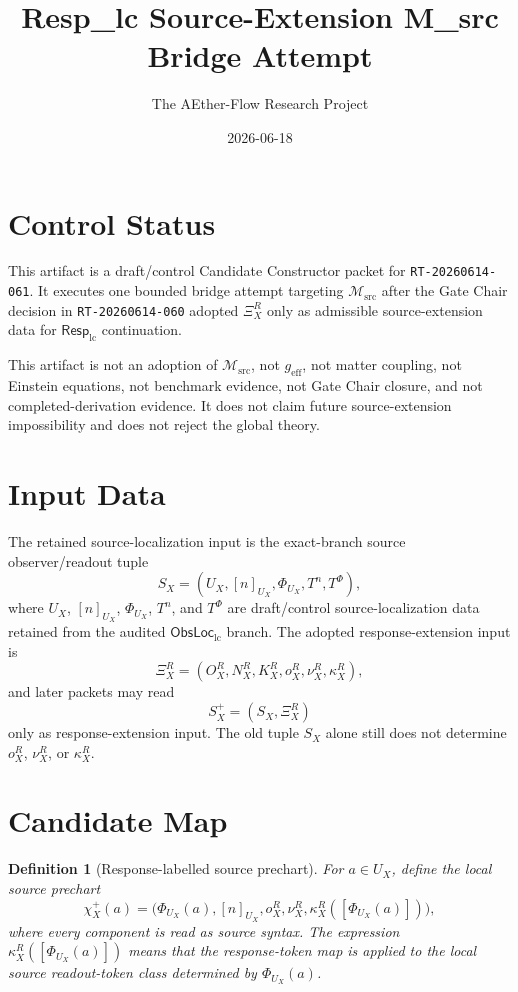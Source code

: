 \documentclass[11pt]{article}
\title{Resp\_lc Source-Extension M\_src Bridge Attempt}
\author{The AEther-Flow Research Project}
\date{2026-06-18}
\newcommand{\RespLC}{\mathsf{Resp}_{\mathrm{lc}}}
\newcommand{\ObsLocLC}{\mathsf{ObsLoc}_{\mathrm{lc}}}
\newcommand{\Msrc}{\mathcal{M}_{\mathrm{src}}}
\newcommand{\geff}{g_{\mathrm{eff}}}
\newcommand{\XiR}{\Xi_X^R}
\newcommand{\SX}{S_X}
\newcommand{\Splus}{S_X^+}
\newcommand{\PhiU}{\Phi_{U_X}}
\newtheorem{definition}{Definition}
\begin{document}
\maketitle

\section*{Control Status}

This artifact is a draft/control Candidate Constructor packet for
\texttt{RT-20260614-061}. It executes one bounded bridge attempt
targeting \(\Msrc\) after the Gate Chair decision in
\texttt{RT-20260614-060} adopted \(\XiR\) only as admissible
source-extension data for \(\RespLC\) continuation.

This artifact is not an adoption of \(\Msrc\), not \(\geff\), not
matter coupling, not Einstein equations, not benchmark evidence, not
Gate Chair closure, and not completed-derivation evidence. It does not
claim future source-extension impossibility and does not reject the
global theory.

\section{Input Data}

The retained source-localization input is the exact-branch
source observer/readout tuple
\[
  \SX=(U_X,[n]_{U_X},\PhiU,T^n,T^\Phi),
\]
where \(U_X\), \([n]_{U_X}\), \(\PhiU\), \(T^n\), and \(T^\Phi\)
are draft/control source-localization data retained from the audited
\(\ObsLocLC\) branch. The adopted response-extension input is
\[
  \XiR=(O_X^R,N_X^R,K_X^R,o_X^R,\nu_X^R,\kappa_X^R),
\]
and later packets may read
\[
  \Splus=(\SX,\XiR)
\]
only as response-extension input. The old tuple \(\SX\) alone still
does not determine \(o_X^R\), \(\nu_X^R\), or \(\kappa_X^R\).

\section{Candidate Map}

\begin{definition}[Response-labelled source prechart]
For \(a\in U_X\), define the local source prechart
\[
  \chi_X^+(a)=
  \bigl(\PhiU(a),[n]_{U_X},o_X^R,\nu_X^R,
  \kappa_X^R([\PhiU(a)])\bigr),
\]
where every component is read as source syntax. The expression
\(\kappa_X^R([\PhiU(a)])\) means that the response-token map is applied
to the local source readout-token class determined by \(\PhiU(a)\).
\end{definition}
\end{document}
